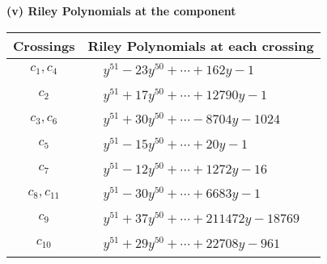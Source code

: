 \documentclass[1p]{elsarticle_modified}
\theoremstyle{definition}
\begin{document}
\newpage\renewcommand{\arraystretch}{1}
\flushleft \textbf{(v) Riley Polynomials at the component}\newline \\
\begin{tabular}{m{50pt}|m{274pt}}
Crossings & \hspace{64pt}Riley Polynomials at each crossing \\
\hline $$\begin{aligned}c_{1},c_{4}\end{aligned}$$&$\begin{aligned}
&y^{51}-23 y^{50}+\cdots+162 y-1
\end{aligned}$\\
\hline $$\begin{aligned}c_{2}\end{aligned}$$&$\begin{aligned}
&y^{51}+17 y^{50}+\cdots+12790 y-1
\end{aligned}$\\
\hline $$\begin{aligned}c_{3},c_{6}\end{aligned}$$&$\begin{aligned}
&y^{51}+30 y^{50}+\cdots-8704 y-1024
\end{aligned}$\\
\hline $$\begin{aligned}c_{5}\end{aligned}$$&$\begin{aligned}
&y^{51}-15 y^{50}+\cdots+20 y-1
\end{aligned}$\\
\hline $$\begin{aligned}c_{7}\end{aligned}$$&$\begin{aligned}
&y^{51}-12 y^{50}+\cdots+1272 y-16
\end{aligned}$\\
\hline $$\begin{aligned}c_{8},c_{11}\end{aligned}$$&$\begin{aligned}
&y^{51}-30 y^{50}+\cdots+6683 y-1
\end{aligned}$\\
\hline $$\begin{aligned}c_{9}\end{aligned}$$&$\begin{aligned}
&y^{51}+37 y^{50}+\cdots+211472 y-18769
\end{aligned}$\\
\hline $$\begin{aligned}c_{10}\end{aligned}$$&$\begin{aligned}
&y^{51}+29 y^{50}+\cdots+22708 y-961
\end{aligned}$\\
\hline
\end{tabular}\\~\\
\end{document}
